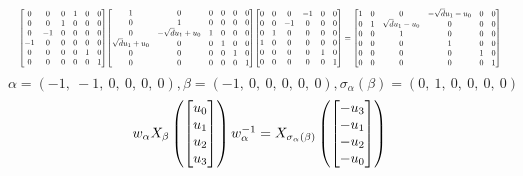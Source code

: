 \documentclass[11pt]{article}
\theoremstyle{definition}
\begin{document}
\[
\scaletoalign{\textwidth}{{\left[\begin{matrix}0 & 0 & 0 & 1 & 0 & 0\\0 & 0 & 1 & 0 & 0 & 0\\0 & -1 & 0 & 0 & 0 & 0\\-1 & 0 & 0 & 0 & 0 & 0\\0 & 0 & 0 & 0 & 1 & 0\\0 & 0 & 0 & 0 & 0 & 1\end{matrix}\right]} {\left[\begin{matrix}1 & 0 & 0 & 0 & 0 & 0\\0 & 1 & 0 & 0 & 0 & 0\\0 & - \sqrt{d} u_{1} + u_{0} & 1 & 0 & 0 & 0\\\sqrt{d} u_{1} + u_{0} & 0 & 0 & 1 & 0 & 0\\0 & 0 & 0 & 0 & 1 & 0\\0 & 0 & 0 & 0 & 0 & 1\end{matrix}\right]} {\left[\begin{matrix}0 & 0 & 0 & -1 & 0 & 0\\0 & 0 & -1 & 0 & 0 & 0\\0 & 1 & 0 & 0 & 0 & 0\\1 & 0 & 0 & 0 & 0 & 0\\0 & 0 & 0 & 0 & 1 & 0\\0 & 0 & 0 & 0 & 0 & 1\end{matrix}\right]} = {\left[\begin{matrix}1 & 0 & 0 & - \sqrt{d} u_{1} - u_{0} & 0 & 0\\0 & 1 & \sqrt{d} u_{1} - u_{0} & 0 & 0 & 0\\0 & 0 & 1 & 0 & 0 & 0\\0 & 0 & 0 & 1 & 0 & 0\\0 & 0 & 0 & 0 & 1 & 0\\0 & 0 & 0 & 0 & 0 & 1\end{matrix}\right]}}
\]
\[
\alpha = \left( -1, \  -1, \  0, \  0, \  0, \  0\right), \beta = \left( -1, \  0, \  0, \  0, \  0, \  0\right), \sigma_{\alpha}(\beta) = \left( 0, \  1, \  0, \  0, \  0, \  0\right)
\]
\[
\scaletoalign{\textwidth}{w_{\alpha} X_{\beta}\left(\left[\begin{matrix}u_{0}\\u_{1}\\u_{2}\\u_{3}\end{matrix}\right]\right) w_{\alpha}^{-1} = X_{\sigma_{\alpha}\left(\beta\right)}\left(\left[\begin{matrix}- u_{3}\\- u_{1}\\- u_{2}\\- u_{0}\end{matrix}\right]\right)}
\]
\end{document}
